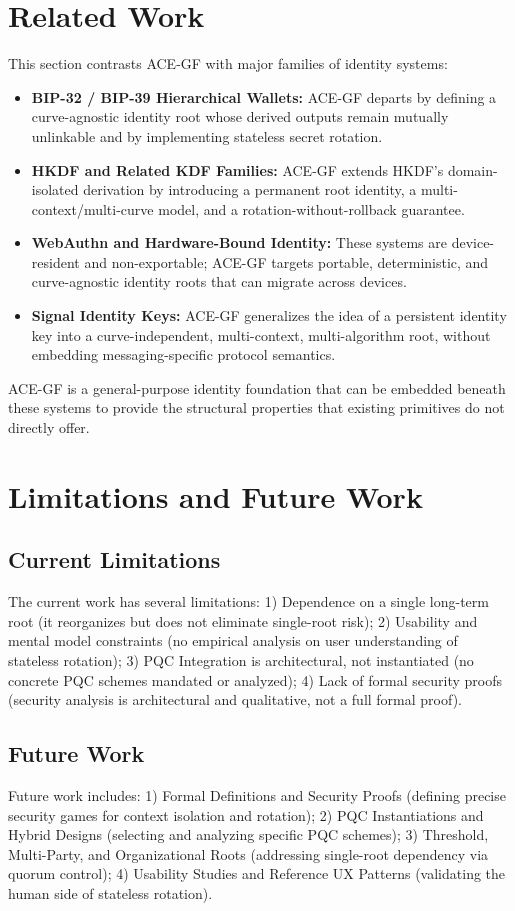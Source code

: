 \documentclass[11pt,a4paper]{article}
\begin{document}
\section{Related Work}
This section contrasts ACE-GF with major families of identity systems:
\begin{itemize}[noitemsep, nolistsep]
    \item \textbf{BIP-32 / BIP-39 Hierarchical Wallets:} ACE-GF departs by defining a curve-agnostic identity root whose derived outputs remain mutually unlinkable and by implementing stateless secret rotation.
    \item \textbf{HKDF and Related KDF Families:} ACE-GF extends HKDF's domain-isolated derivation by introducing a permanent root identity, a multi-context/multi-curve model, and a rotation-without-rollback guarantee.
    \item \textbf{WebAuthn and Hardware-Bound Identity:} These systems are device-resident and non-exportable; ACE-GF targets portable, deterministic, and curve-agnostic identity roots that can migrate across devices.
    \item \textbf{Signal Identity Keys:} ACE-GF generalizes the idea of a persistent identity key into a curve-independent, multi-context, multi-algorithm root, without embedding messaging-specific protocol semantics.
\end{itemize}
ACE-GF is a general-purpose identity foundation that can be embedded beneath these systems to provide the structural properties that existing primitives do not directly offer.

\section{Limitations and Future Work}
\subsection{Current Limitations}
The current work has several limitations: 1) Dependence on a single long-term root (it reorganizes but does not eliminate single-root risk); 2) Usability and mental model constraints (no empirical analysis on user understanding of stateless rotation); 3) PQC Integration is architectural, not instantiated (no concrete PQC schemes mandated or analyzed); 4) Lack of formal security proofs (security analysis is architectural and qualitative, not a full formal proof).

\subsection{Future Work}
Future work includes: 1) Formal Definitions and Security Proofs (defining precise security games for context isolation and rotation); 2) PQC Instantiations and Hybrid Designs (selecting and analyzing specific PQC schemes); 3) Threshold, Multi-Party, and Organizational Roots (addressing single-root dependency via quorum control); 4) Usability Studies and Reference UX Patterns (validating the human side of stateless rotation).
\end{document}
